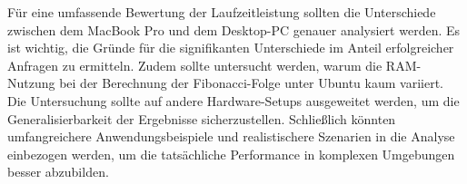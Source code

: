 \noindent
Für eine umfassende Bewertung der Laufzeitleistung sollten die Unterschiede zwischen dem MacBook Pro und dem Desktop-PC genauer analysiert werden. Es ist wichtig, die Gründe für die signifikanten Unterschiede im Anteil erfolgreicher Anfragen zu ermitteln. Zudem sollte untersucht werden, warum die RAM-Nutzung bei der Berechnung der Fibonacci-Folge unter Ubuntu kaum variiert. Die Untersuchung sollte auf andere Hardware-Setups ausgeweitet werden, um die Generalisierbarkeit der Ergebnisse sicherzustellen. Schließlich könnten umfangreichere Anwendungsbeispiele und realistischere Szenarien in die Analyse einbezogen werden, um die tatsächliche Performance in komplexen Umgebungen besser abzubilden.
